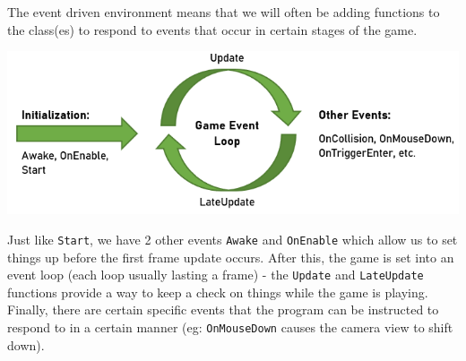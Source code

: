\documentclass{article}[a4paper,12pt]
\theoremstyle{definition}
\begin{document}
The event driven environment means that we will often be adding functions to the class(es) to respond to events that occur in certain stages of the game.
\begin{center}\includegraphics{ecent_cycle.png}\end{center}
Just like \texttt{Start}, we have 2 other events \texttt{Awake} and \texttt{OnEnable} which allow us to set things up before the first frame update occurs. After this, the game is set into an event loop (each loop usually lasting a frame) - the \texttt{Update} and \texttt{LateUpdate} functions provide a way to keep a check on things while the game is playing. Finally, there are certain specific events that the program can be instructed to respond to in a certain manner (eg: \texttt{OnMouseDown} causes the camera view to shift down).
\end{document}

